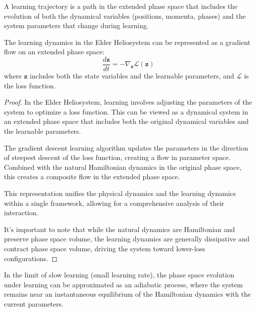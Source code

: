 \begin{definition}
A learning trajectory is a path in the extended phase space that includes the evolution of both the dynamical variables (positions, momenta, phases) and the system parameters that change during learning.
\end{definition}

\begin{theorem}
The learning dynamics in the Elder Heliosystem can be represented as a gradient flow on an extended phase space:
\begin{equation}
\frac{d\mathbf{z}}{dt} = -\nabla_{\mathbf{z}} \mathcal{L}(\mathbf{z})
\end{equation}
where $\mathbf{z}$ includes both the state variables and the learnable parameters, and $\mathcal{L}$ is the loss function.
\end{theorem}

\begin{proof}
In the Elder Heliosystem, learning involves adjusting the parameters of the system to optimize a loss function. This can be viewed as a dynamical system in an extended phase space that includes both the original dynamical variables and the learnable parameters.

The gradient descent learning algorithm updates the parameters in the direction of steepest descent of the loss function, creating a flow in parameter space. Combined with the natural Hamiltonian dynamics in the original phase space, this creates a composite flow in the extended phase space.

This representation unifies the physical dynamics and the learning dynamics within a single framework, allowing for a comprehensive analysis of their interaction.

It's important to note that while the natural dynamics are Hamiltonian and preserve phase space volume, the learning dynamics are generally dissipative and contract phase space volume, driving the system toward lower-loss configurations.
\end{proof}

\begin{theorem}
In the limit of slow learning (small learning rate), the phase space evolution under learning can be approximated as an adiabatic process, where the system remains near an instantaneous equilibrium of the Hamiltonian dynamics with the current parameters.
\end{theorem}

